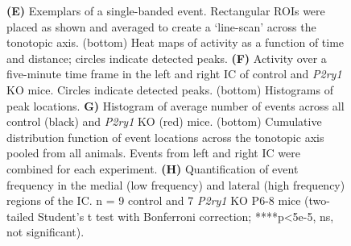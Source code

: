 \documentclass[9pt,lineno]{elife}
\begin{document}
\begin{figure}
\begin{fullwidth}
{\textbf{(E)} Exemplars of a single-banded event. Rectangular ROIs were placed as shown and averaged to create a `line-scan' across the tonotopic axis. (bottom) Heat maps of activity as a function of time and distance; circles indicate detected peaks.
\textbf{(F)} Activity over a five-minute time frame in the left and right IC of control and \textit{P2ry1} KO mice. Circles indicate detected peaks. (bottom) Histograms of peak locations.
\textbf{G)} Histogram of average number of events across all control (black) and \textit{P2ry1} KO (red) mice. (bottom) Cumulative distribution function of event locations across the tonotopic axis pooled from all animals. Events from left and right IC were combined for each experiment.
\textbf{(H)} Quantification of event frequency in the medial (low frequency) and lateral (high frequency) regions of the IC. n = 9 control and 7 \textit{P2ry1} KO P6-8 mice (two-tailed Student's t test with Bonferroni correction; ****p<5e-5, ns, not significant).}
\label{fig:f7}
\label{figsupp:sf7p1}
\end{fullwidth}
\end{figure}
\end{document}
